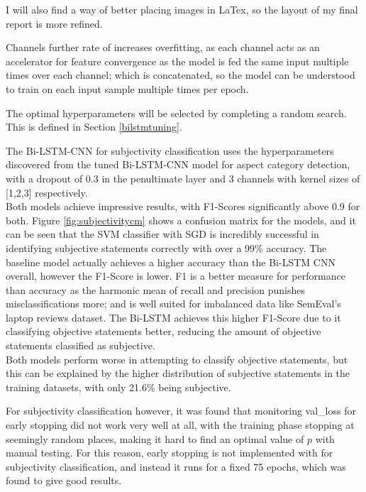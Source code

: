 I will also find a way of better placing images in LaTex, so the layout of my final report is more refined. 
\newpage


Channels further rate of increases overfitting, as each channel acts as an accelerator for feature convergence as the model is fed the same input multiple times over each channel; which is concatenated, so the model can be understood to train on each input sample multiple times per epoch. 


The optimal hyperparameters will be selected by completing a random search. This is defined in Section \ref{bilstmtuning}.


The Bi-LSTM-CNN for subjectivity classification uses the hyperparameters discovered from the tuned Bi-LSTM-CNN model for aspect category detection, with a dropout of 0.3 in the penultimate layer and 3 channels with kernel sizes of [1,2,3] respectively.  \\
Both models achieve impressive results, with F1-Scores significantly above 0.9 for both. Figure \ref{fig:subjectivitycm} shows a confusion matrix for the models, and it can be seen that the SVM classifier with SGD is incredibly successful in identifying subjective statements correctly with over a 99\% accuracy. The baseline model actually achieves a higher accuracy than the Bi-LSTM CNN overall, however the F1-Score is lower. F1 is a better measure for performance than accuracy as the harmonic mean of recall and precision punishes misclassifications more; and is well suited for imbalanced data like SemEval's laptop reviews dataset. The Bi-LSTM achieves this higher F1-Score due to it classifying objective statements better, reducing the amount of objective statements classified as subjective.\\
Both models perform worse in attempting to classify objective statements, but this can be explained by the higher distribution of subjective statements in the training datasets, with only 21.6\% being subjective.  


For subjectivity classification however, it was found that monitoring val\_loss for early stopping did not work very well at all, with the training phase stopping at seemingly random places, making it hard to find an optimal value of $p$ with manual testing. For this reason, early stopping is not implemented with for subjectivity classification, and instead it runs for a fixed 75 epochs, which was found to give good results.
